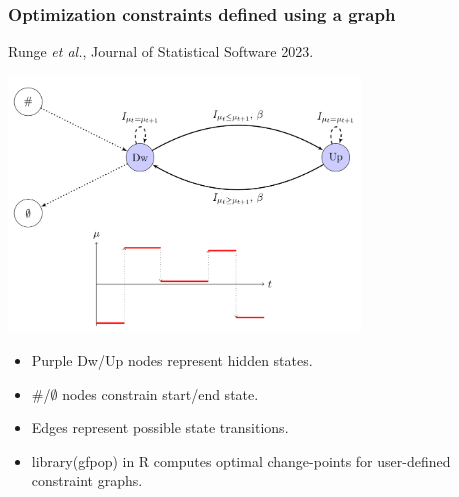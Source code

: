 \documentclass{beamer}
\newcommand{\RR}{\mathbb R}
\begin{document}
\begin{frame}
  \frametitle{Optimization constraints defined using a graph}
  Runge \emph{et al.}, Journal of Statistical Software 2023.

  \includegraphics[width=0.7\textwidth]{gfpop-up-down}

  \begin{itemize}
  \item Purple Dw/Up nodes represent hidden states.
  \item \#/$\emptyset$ nodes constrain start/end state.
  \item Edges represent possible state transitions.
  \item library(gfpop) in R computes optimal
    change-points for user-defined constraint graphs.
  \end{itemize}

\end{frame}



\end{document}
